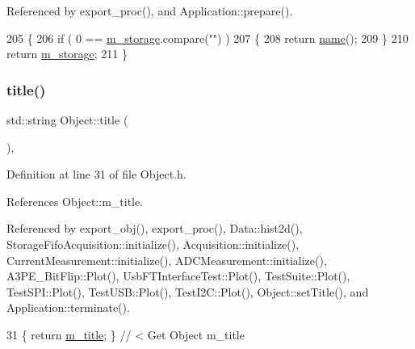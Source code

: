 Referenced by export\+\_\+proc(), and Application\+::prepare().


\begin{DoxyCode}
205                        \{
206     \textcolor{keywordflow}{if} ( 0 == \hyperlink{classProcessus_a132b1e71f72327e5a87f0a168c7b6325}{m\_storage}.compare(\textcolor{stringliteral}{""}) )
207     \{
208       \textcolor{keywordflow}{return} \hyperlink{classObject_a300f4c05dd468c7bb8b3c968868443c1}{name}();
209     \}
210     \textcolor{keywordflow}{return} \hyperlink{classProcessus_a132b1e71f72327e5a87f0a168c7b6325}{m\_storage};
211   \}
\end{DoxyCode}
\mbox{\label{classObject_a73a0f1a41828fdd8303dd662446fb6c3}} 
\subsubsection{\texorpdfstring{title()}{title()}}
{\footnotesize\ttfamily std\+::string Object\+::title (\begin{DoxyParamCaption}{ }\end{DoxyParamCaption})\hspace{0.3cm}{\ttfamily [inline]}, {\ttfamily [inherited]}}



Definition at line 31 of file Object.\+h.



References Object\+::m\+\_\+title.



Referenced by export\+\_\+obj(), export\+\_\+proc(), Data\+::hist2d(), Storage\+Fifo\+Acquisition\+::initialize(), Acquisition\+::initialize(), Current\+Measurement\+::initialize(), A\+D\+C\+Measurement\+::initialize(), A3\+P\+E\+\_\+\+Bit\+Flip\+::\+Plot(), Usb\+F\+T\+Interface\+Test\+::\+Plot(), Test\+Suite\+::\+Plot(), Test\+S\+P\+I\+::\+Plot(), Test\+U\+S\+B\+::\+Plot(), Test\+I2\+C\+::\+Plot(), Object\+::set\+Title(), and Application\+::terminate().


\begin{DoxyCode}
31 \{ \textcolor{keywordflow}{return} \hyperlink{classObject_affbeea1953eb5163573b92fad8f75727}{m\_title};      \} \textcolor{comment}{// < Get Object m\_title}
\end{DoxyCode}
\mbox{\label{classObject_a84f99f70f144a83e1582d1d0f84e4e62}} 
